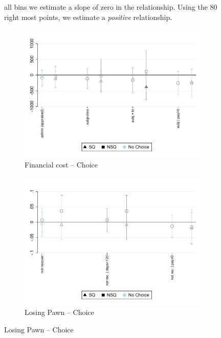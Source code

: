 \documentclass[oneside,11pt]{article}
\begin{document}
\begin{figure}[H]
all bins we estimate a slope of zero in the relationship. Using the 80 right most points, we estimate a \textit{positive} relationship.
\end{figure}






\begin{figure}[H]
    \caption{The effect of promises}
    \label{fc_pro5}
    \begin{center}
    

        \begin{subfigure}{0.45\textwidth}
        \caption{Financial cost -- Choice}
        \centering
        \includegraphics[width=\textwidth]{Figuras/fc_te_pro_5.pdf}
    \end{subfigure}
    \begin{subfigure}{0.45\textwidth}
        \caption{Losing Pawn -- Choice}
        \centering
        \includegraphics[width=\textwidth]{Figuras/def_te_pro_5.pdf}
    \end{subfigure}
    

\end{center}
\end{figure}
\end{document}
